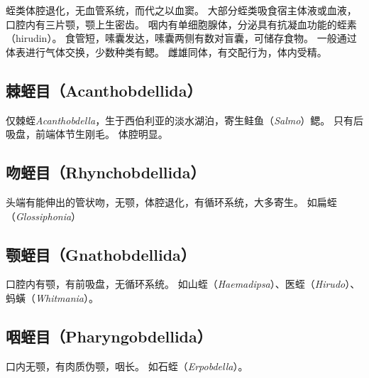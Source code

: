 \documentclass[11pt]{article}
\begin{document}
蛭类体腔退化，无血管系统，而代之以血窦。
大部分蛭类吸食宿主体液或血液，口腔内有三片颚，颚上生密齿。
咽内有单细胞腺体，分泌具有抗凝血功能的蛭素（hirudin）。
食管短，嗉囊发达，嗉囊两侧有数对盲囊，可储存食物。
一般通过体表进行气体交换，少数种类有鳃。
雌雄同体，有交配行为，体内受精。

\subsection{棘蛭目（Acanthobdellida）}
仅棘蛭\textit{Acanthobdella}，生于西伯利亚的淡水湖泊，寄生鲑鱼（\textit{Salmo}）鳃。
只有后吸盘，前端体节生刚毛。
体腔明显。

\subsection{吻蛭目（Rhynchobdellida）}
头端有能伸出的管状吻，无颚，体腔退化，有循环系统，大多寄生。
如扁蛭（\textit{Glossiphonia}）

\subsection{颚蛭目（Gnathobdellida）}
口腔内有颚，有前吸盘，无循环系统。
如山蛭（\textit{Haemadipsa}）、医蛭（\textit{Hirudo}）、蚂蟥（\textit{Whitmania}）。

\subsection{咽蛭目（Pharyngobdellida）}
口内无颚，有肉质伪颚，咽长。
如石蛭（\textit{Erpobdella}）。
\end{document}
